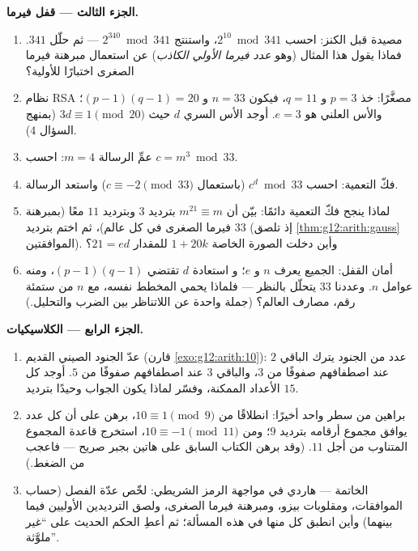 \begin{problem}
\medskip
\noindent\textbf{الجزء الثالث --- قفل فيرما.}
\begin{enumerate}[resume]
  \item مصيدة قبل الكنز: احسب
        $2^{10} \bmod 341$، واستنتج $2^{340} \bmod 341$ --- ثم
        حلّل $341$. فماذا يقول هذا المثال (وهو
        \emph{عدد فيرما الأولي الكاذب}) عن استعمال مبرهنة فيرما
        الصغرى اختبارًا للأولية؟
  \item نظام RSA مصغَّرًا: خذ $p = 3$ و $q = 11$، فيكون
        $n = 33$ و $(p-1)(q-1) = 20$؛ والأس العلني هو
        $e = 3$. أوجد الأس السري $d$ حيث
        $3d \equiv 1 \pmod{20}$ (بمنهج السؤال 4).
  \item عمِّ الرسالة $m = 4$: احسب
        $c = m^3 \bmod 33$.
  \item فكّ التعمية: احسب $c^d \bmod 33$ (باستعمال
        $c \equiv -2 \pmod{33}$) واستعد الرسالة.
  \item لماذا ينجح فكّ التعمية دائمًا: بيّن أن
        $m^{21} \equiv m$ بترديد $3$ وبترديد $11$ معًا
        (بمبرهنة فيرما الصغرى في كل عالم)، ثم اختم
        بترديد $33$ (إذ تلصق \cref{thm:g12:arith:gauss} الموافقتين).
        وأين دخلت الصورة الخاصة $1 + 20k$ للمقدار $21 = ed$؟
  \item أمان القفل: الجميع يعرف $n$ و $e$؛ و
        استعادة $d$ تقتضي $(p-1)(q-1)$، ومنه عوامل
        $n$. وعددنا $33$ يتحلّل بالنظر --- فلماذا يحمي المخطط
        نفسه، مع $n$ من ستمئة رقم، مصارف
        العالم؟ (جملة واحدة عن اللاتناظر بين
        الضرب والتحليل.)
\end{enumerate}

\medskip
\noindent\textbf{الجزء الرابع --- الكلاسيكيات.}
\begin{enumerate}[resume]
  \item عدّ الجنود الصيني القديم (قارن
        \cref{exo:g12:arith:10}): عدد من الجنود يترك
        الباقي $2$ عند اصطفافهم صفوفًا من $3$، والباقي $3$ عند
        اصطفافهم صفوفًا من $5$. أوجد كل الأعداد الممكنة، وفسّر
        لماذا يكون الجواب وحيدًا بترديد $15$.
  \item براهين من سطر واحد أخيرًا: انطلاقًا من $10 \equiv 1 \pmod 9$،
        برهن على أن كل عدد يوافق مجموع أرقامه
        بترديد $9$؛ ومن $10 \equiv -1 \pmod{11}$، استخرج
        قاعدة المجموع المتناوب من أجل $11$. (وقد برهن الكتاب
        السابق على هاتين بجبر صريح --- فاعجب
        من الضغط.)
  \item الخاتمة --- هاردي في مواجهة الرمز الشريطي: لخّص
        عدّة الفصل (حساب الموافقات، ومقلوبات
        بيزو، ومبرهنة فيرما الصغرى، ولصق الترديدين الأوليين
        فيما بينهما) وأين انطبق كل منها في هذه
        المسألة؛ ثم أعطِ الحكم الحديث على
        ``غير ملوَّثة''.
\end{enumerate}
\end{problem}
